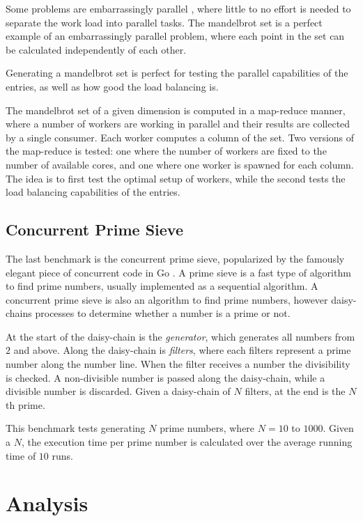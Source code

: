 Some problems are embarrassingly parallel \citep{wilkinson1999parallel}, where little to no effort is needed to separate the work load into parallel tasks. The mandelbrot set is a perfect example of an embarrassingly parallel problem, where each point in the set can be calculated independently of each other.

Generating a mandelbrot set is perfect for testing the parallel capabilities of the entries, as well as how good the load balancing is.

The mandelbrot set of a given dimension is computed in a map\hyp{}reduce manner, where a number of workers are working in parallel and their results are collected by a single consumer. Each worker computes a column of the set. Two versions of the map\hyp{}reduce is tested: one where the number of workers are fixed to the number of available cores, and one where one worker is spawned for each column. The idea is to first test the optimal setup of workers, while the second tests the load balancing capabilities of the entries. 


\subsection{Concurrent Prime Sieve}

The last benchmark is the concurrent prime sieve, popularized by the famously elegant piece of concurrent code in Go \citep{go2017primesieve}. A prime sieve is a fast type of algorithm to find prime numbers, usually implemented as a sequential algorithm. A concurrent prime sieve is also an algorithm to find prime numbers, however daisy\hyp{}chains processes to determine whether a number is a prime or not.

At the start of the daisy\hyp{}chain is the \textit{generator}, which generates all numbers from $2$ and above. Along the daisy\hyp{}chain is \textit{filters}, where each filters represent a prime number along the number line. When the filter receives a number the divisibility is checked. A non\hyp{}divisible number is passed along the daisy\hyp{}chain, while a divisible number is discarded. Given a daisy\hyp{}chain of $N$ filters, at the end is the $N$th prime.

This benchmark tests generating $N$ prime numbers, where $N=10$ to $1000$. Given a $N$, the execution time per prime number is calculated over the average running time of $10$ runs.



\section{Analysis}
\label{sec:analysis}



